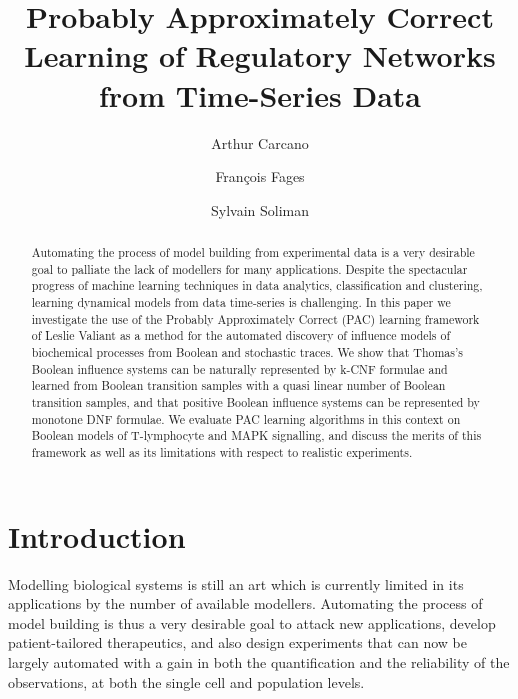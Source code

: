 \documentclass{llncs}
\begin{document}
\title{Probably Approximately Correct Learning of Regulatory Networks from Time-Series Data}

\author{Arthur Carcano \and Fran\c{c}ois Fages \and Sylvain
Soliman}


\maketitle

\begin{abstract}
Automating the process of model building from experimental data 
is a very desirable goal to palliate the lack of modellers for many applications.
Despite the spectacular progress of machine learning techniques in data analytics, classification and clustering,
learning dynamical models from data time-series is challenging.
In this paper we investigate the use of the Probably Approximately Correct (PAC) learning 
framework of Leslie Valiant as a method for the automated discovery of influence models of biochemical processes from Boolean and stochastic traces. 
We show that Thomas's Boolean influence systems can be naturally represented by k-CNF formulae
and learned
from Boolean transition samples with a quasi linear number of Boolean transition samples,
and that positive Boolean influence systems can be represented by monotone DNF formulae.
We evaluate PAC learning algorithms in this context on Boolean models of T-lymphocyte and MAPK signalling,
and discuss the merits of this framework as well as its limitations with respect to realistic experiments.
\end{abstract}

\section{Introduction}

Modelling biological systems is still an art which is currently limited in its applications by the number of available modellers.
Automating the process of model building is thus a very desirable goal
to attack new applications, develop patient-tailored therapeutics,
and also design experiments that can now be largely automated
with a gain in both the quantification and the reliability of the observations, at both the single cell and population levels.
\end{document}
